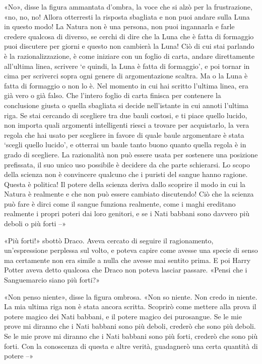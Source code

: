 «No», disse la figura ammantata d’ombra, la voce che si alzò per la frustrazione, «no, no, no! Allora otterresti la risposta sbagliata e non puoi andare sulla Luna in questo modo! La Natura non è una persona, non puoi ingannarla e farle credere qualcosa di diverso, se cerchi di dire che la Luna che è fatta di formaggio puoi discutere per giorni e questo non cambierà la Luna! Ciò di cui stai parlando è la razionalizzazione, è come iniziare con un foglio di carta, andare direttamente all’ultima linea, scrivere ‘e quindi, la Luna è fatta di formaggio’, e poi tornar in cima per scriverci sopra ogni genere di argomentazione scaltra. Ma o la Luna è fatta di formaggio o non lo è. Nel momento in cui hai scritto l’ultima linea, era già vero o già falso. Che l’intero foglio di carta finisca per contenere la conclusione giusta o quella sbagliata si decide nell’istante in cui annoti l’ultima riga. Se stai cercando di scegliere tra due bauli costosi, e ti piace quello lucido, non importa quali argomenti intelligenti riesci a trovare per acquistarlo, la vera regola che hai usato per scegliere in favore di quale baule argomentare è stata ‘scegli quello lucido’, e otterrai un baule tanto buono quanto quella regola è in grado di scegliere. La razionalità non può essere usata per sostenere una posizione prefissata, il suo unico uso possibile è decidere da che parte schierarsi. Lo scopo della scienza non è convincere qualcuno che i puristi del sangue hanno ragione. Questa è politica! Il potere della scienza deriva dallo scoprire il modo in cui la Natura è realmente e che non può essere cambiato discutendo! Ciò che la scienza può fare è dirci come il sangue funziona realmente, come i maghi ereditano realmente i propri poteri dai loro genitori, e se i Nati babbani sono davvero più deboli o più forti –»

«Più forti!» sbottò Draco. Aveva cercato di seguire il ragionamento, un’espressione perplessa sul volto, e poteva capire come avesse una specie di senso ma certamente non era simile a nulla che avesse mai sentito prima. E poi Harry Potter aveva detto qualcosa che Draco non poteva lasciar passare. «Pensi che i Sanguemarcio siano più forti?»

«Non penso niente», disse la figura ombrosa. «Non so niente. Non credo in niente. La mia ultima riga non è stata ancora scritta. Scoprirò come mettere alla prova il potere magico dei Nati babbani, e il potere magico dei purosangue. Se le mie prove mi diranno che i Nati babbani sono più deboli, crederò che sono più deboli. Se le mie prove mi diranno che i Nati babbani sono più forti, crederò che sono più forti. Con la conoscenza di questa e altre verità, guadagnerò una certa quantità di potere –»

